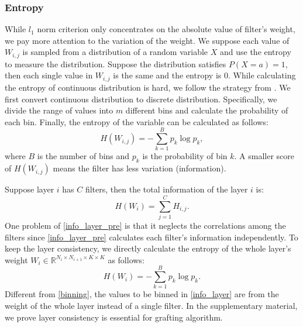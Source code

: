 \documentclass{article}
\begin{document}
\subsubsection{Entropy}	\label{sec_3_2_2}


While $l_{1}$ norm criterion only concentrates on the absolute value of filter's weight, we pay more attention to the variation of the weight. 
We suppose each value of $W_{i,j}$ is sampled from a distribution of a random variable $X$ and use the entropy to measure the distribution. Suppose the distribution satisfies $P(X=a)=1$, then each single value in $W_{i,j}$ is the same and the entropy is 0. 
While calculating the entropy of continuous distribution is hard, we follow the strategy from \cite{shwartz2017opening,cheng2019utilizing}. We first convert continuous distribution to discrete distribution. Specifically, we divide the range of values into $m$ different bins and calculate the probability of each bin. Finally, the entropy of the variable can be calculated as follows:
\begin{equation}\label{binning}
	H(W_{i,j}) =-\sum_{k=1}^{B}p_k\log p_k,
\end{equation}
where $B$ is the number of bins and $p_{k}$ is the probability of bin $k$. A smaller score of $H(W_{i,j})$ means the filter has less variation (information).

Suppose layer $i$ has $C$ filters, then the total information of the layer $i$ is:
\begin{equation}\label{info_layer_pre}
	H(W_{i}) = \sum_{j=1}^{C} H_{i,j}.
\end{equation}
One problem of \eqref{info_layer_pre} is that it neglects the correlations among the filters since \eqref{info_layer_pre} calculates each filter's information independently. To keep the layer consistency, we directly calculate the entropy of the whole layer's weight $W_{i}\in \mathbb{R}^{N_{i}\times N_{i+1}\times K\times K }$ as follows:
\begin{equation}\label{info_layer}
	H(W_{i})=-\sum_{k=1}^{B}p_k\log p_k.
\end{equation}
Different from \eqref{binning}, the values to be binned in \eqref{info_layer} are from the weight of the whole layer instead of a single filter. In the supplementary material, we prove layer consistency is essential for grafting algorithm.
\end{document}
